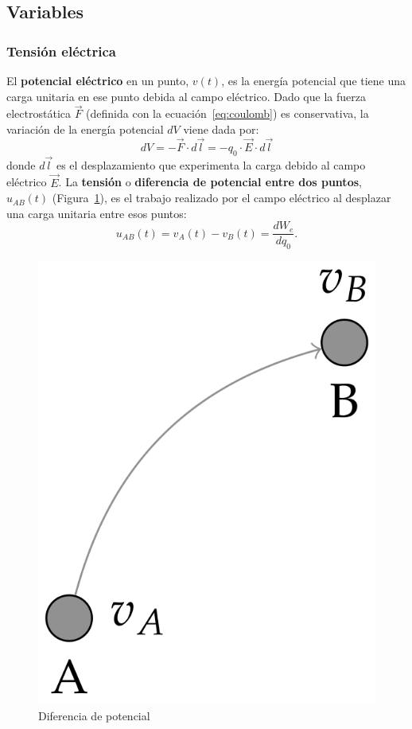 \subsection{Variables}
\subsubsection{Tensión eléctrica}
El \textbf{potencial eléctrico} en un punto, $v(t)$, es la energía
potencial que tiene una carga unitaria en ese punto debida al campo
eléctrico. Dado que la fuerza electrostática $\vec{F}$ (definida con
la ecuación~\eqref{eq:coulomb}) es conservativa, la variación de la
energía potencial $dV$ viene dada por:
\begin{equation*}
  dV=-\Vec{F}\cdot d\vec{l}=-q_0\cdot \Vec{E}\cdot d\vec{l}
\end{equation*}
donde $d\vec{l}$ es el desplazamiento que experimenta la carga debido
al campo eléctrico $\Vec{E}$. La \textbf{tensión} o \textbf{diferencia
  de potencial entre dos puntos}, $u_{AB}(t)$
(Figura~\ref{fig:tension_puntos}), es el trabajo realizado por el
campo eléctrico al desplazar una carga unitaria entre esos puntos:
\begin{equation*}
  u_{AB}(t) = v_A(t) - v_B(t) = \frac{dW_{e}}{dq_0}.
\end{equation*}
\begin{figure}[H]
  \centering
  \includegraphics[width=0.2\linewidth]{../figs/tension_puntos.PNG}
  \caption{Diferencia de potencial}
  \label{fig:tension_puntos}
\end{figure}
	
